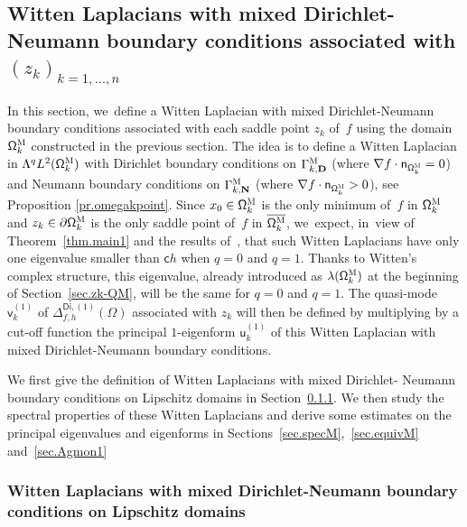 \documentclass[10pt]{amsart}
\newcommand{\mbf}[1]{\mathbf{#1}}
\let\pa\partial
\theoremstyle{plain}
\theoremstyle{definition}
\begin{document}
\subsection{Witten Laplacians with mixed Dirichlet-Neumann boundary conditions associated with $(z_k)_{k=1,\ldots,n}$}
\label{sec.Witten-TN}

In this section, we~define a Witten Laplacian with mixed Dirichlet-Neumann boundary conditions associated with each saddle point $z_k$ of~$f$ using the domain $\mathsf \Omega_k^{\textsc{M}}$ constructed in the previous section. The idea is to define a Witten Laplacian in $\Lambda^qL^2(\mathsf \Omega_k^{\textsc{M}})$ with
Dirichlet boundary conditions on $\Gamma_{k,\mbf D}^{\textsc{M}}$ (where $ \nabla f\cdot \mathsf n_{ \mathsf \Omega_k^{\textsc{M}} } =0$) and Neumann boundary conditions on $\Gamma_{k,\mbf N}^{\textsc{M}}$ (where $ \nabla f\cdot \mathsf n_{ \mathsf \Omega_k^{\textsc{M}} } >0$), see Proposition \ref{pr.omegakpoint}. Since $x_0\in \mathsf \Omega_k^{\textsc{M}}$ is the only minimum of~$f$ in $\mathsf \Omega_k^{\textsc{M}}$ and $z_k\in \pa \mathsf \Omega_k^{\textsc{M}}$ is the only saddle point of~$f$ in $\overline{ \mathsf \Omega_k^{\textsc{M}}}$, we~expect, in~view of Theorem~\ref{thm.main1} and the results of~\cite{le-peutrec-10}, that such Witten Laplacians have only one eigenvalue smaller than $\mathsf ch$ when $q=0$ and $q=1$.
Thanks to Witten's complex structure,
this eigenvalue, already introduced as $\lambda(\mathsf
\Omega_k^{\textsc{M}})$ at the beginning of Section~\ref{sec.zk-QM},
will be the same for $q=0$ and $q=1$. The quasi-mode $\mathsf
v_k^{(1)} $ of $\Delta_{f,h}^{\mathsf{Di},(1)}(\Omega)$ associated
with $z_k$ will then be defined by multiplying by a cut-off function the principal $1$-eigenform $\mathsf u_k^{(1)}$ of this Witten Laplacian with mixed Dirichlet-Neumann boundary conditions.

We first give the definition of Witten Laplacians with mixed
Dirichlet- Neumann boundary conditions on
Lipschitz domains in Section~\ref{sec.Witten-general-result}. We
then study the spectral properties of these Witten Laplacians and
derive some estimates on the principal eigenvalues and eigenforms in
Sections~\ref{sec.specM},~\ref{sec.equivM} and~\ref{sec.Agmon1}

\subsubsection{Witten Laplacians with mixed
Dirichlet-Neumann boundary conditions on Lipschitz domains}
\label{sec.Witten-general-result}
\end{document}
